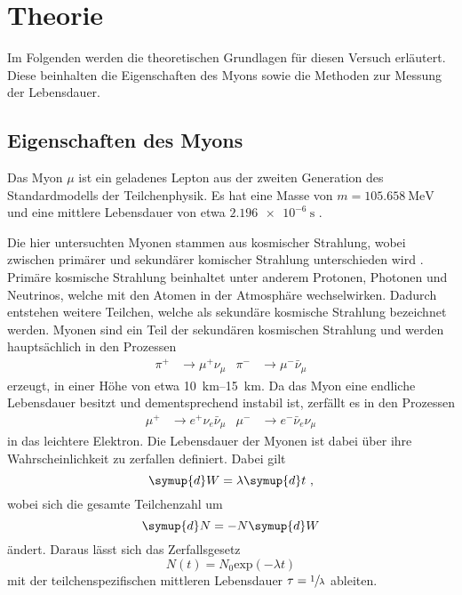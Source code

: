 \section{Theorie}
\label{sec:theorie}

Im Folgenden werden die theoretischen Grundlagen für diesen Versuch erläutert.
Diese beinhalten die Eigenschaften des Myons
sowie die Methoden zur Messung der Lebensdauer.


\subsection{Eigenschaften des Myons}

Das Myon $\mu$ ist ein geladenes Lepton aus der zweiten Generation des Standardmodells der Teilchenphysik.
Es hat eine Masse von $m = \SI{105.658}{\mega\eV}$ und eine mittlere Lebensdauer von etwa $\SI{2,196e-6}{\second}$ \cite{pdg}.

Die hier untersuchten Myonen stammen aus kosmischer Strahlung,
wobei zwischen primärer und sekundärer komischer Strahlung unterschieden wird \cite{grupen}.
Primäre kosmische Strahlung beinhaltet unter anderem Protonen,
Photonen und Neutrinos,
welche mit den Atomen in der Atmosphäre wechselwirken.
Dadurch entstehen weitere Teilchen,
welche als sekundäre kosmische Strahlung bezeichnet werden.
Myonen sind ein Teil der sekundären kosmischen Strahlung und werden hauptsächlich in den Prozessen
\begin{align*}
    \pi^{+} &\to \mu^{+}     \nu_{\mu} &
    \pi^{-} &\to \mu^{-} \bar\nu_{\mu}
\end{align*}
erzeugt,
in einer Höhe von etwa \SIrange{10}{15}{\kilo\meter}.
Da das Myon eine endliche Lebensdauer besitzt und dementsprechend instabil ist,
zerfällt es in den Prozessen
\begin{align*}
    \mu^{+} &\to e^{+}     \nu_{e} \bar\nu_{\mu} &
    \mu^{-} &\to e^{-} \bar\nu_{e}     \nu_{\mu}
\end{align*}
in das leichtere Elektron.
Die Lebensdauer der Myonen ist dabei über ihre Wahrscheinlichkeit zu zerfallen definiert.
Dabei gilt
\begin{equation*}
    \symup{d}W = \lambda \symup{d}t \ ,
\end{equation*}
wobei sich die gesamte Teilchenzahl um
\begin{equation*}
    \symup{d}N = -N \symup{d}W
\end{equation*}
ändert.
Daraus lässt sich das Zerfallsgesetz
\begin{equation*}
    N(t) = N_0 \text{exp}(- \lambda t)
\end{equation*}
mit der teilchenspezifischen mittleren Lebensdauer $\tau = \sfrac{1}{\lambda}$ ableiten.


